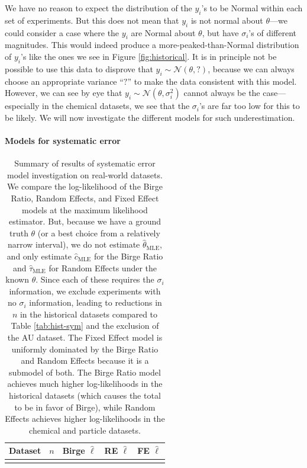 \documentclass[12pt]{article}
\begin{document}
We have no reason to expect the distribution of the $y_i$'s to be Normal within each set of experiments. But this does not mean that $y_i$ is not normal about $\theta$---we could consider a case where the $y_i$ are Normal about $\theta$, but have $\sigma_i$'s of different magnitudes. This would indeed produce a more-peaked-than-Normal distribution of $y_i$'s like the ones we see in Figure \ref{fig:historical}. It is in principle not be possible to use this data to disprove that $y_i\sim\mathcal{N}(\theta,?)$, because we can always choose an appropriate variance ``$?$'' to make the data consistent with this model. However, we can see by eye that $y_i\sim\mathcal{N}(\theta,\sigma_i^2)$ cannot always be the case---especially in the chemical datasets, we see that the $\sigma_i$'s are far too low for this to be likely. We will now investigate the different models for such underestimation.

\paragraph{Models for systematic error} 

\begin{table}
\centering
\caption{Summary of results of systematic error model investigation on real-world datasets. We compare the log-likelihood of the Birge Ratio, Random Effects, and Fixed Effect models at the maximum likelihood estimator. But, because we have a ground truth $\theta$ (or a best choice from a relatively narrow interval), we do not estimate $\hat\theta_{\mathrm{MLE}}$, and only estimate $\hat{c}_{\mathrm{MLE}}$ for the Birge Ratio and $\hat{\tau}_{\mathrm{MLE}}$ for Random Effects under the known $\theta$. Since each of these requires the $\sigma_i$ information, we exclude experiments with no $\sigma_i$ information, leading to reductions in $n$ in the historical datasets compared to Table \ref{tab:hist-sym} and the exclusion of the AU dataset. The Fixed Effect model is uniformly dominated by the Birge Ratio and Random Effects because it is a submodel of both. The Birge Ratio model achieves much higher log-likelihoods in the historical datasets (which causes the total to be in favor of Birge), while Random Effects achieves higher log-likelihoods in the chemical and particle datasets.}
\label{tab:hist-syst}
\smaller
\begin{tabular}{lrrrr}
  \hline Dataset & $n$ & Birge $\hat\ell$ & RE $\hat\ell$ & FE $\hat\ell$ \\\hline\hline
  \\\hline
  \end{tabular}
\end{table}
\end{document}
